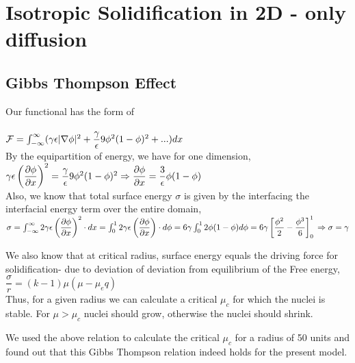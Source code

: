 \documentclass[a4paper]{report}
\begin{document}
\section{Isotropic Solidification in 2D - only diffusion}

\subsection*{Gibbs Thompson Effect}

Our functional has the form of\\
\\
${\cal F} = \int_{-\infty}^{\infty}(\gamma \epsilon|\nabla\phi|^2 + \dfrac{\gamma}{\epsilon}9\phi^2(1-\phi)^2 + ...)dx$\\
By the equipartition of energy, we have for one dimension,\\

$\gamma\epsilon\left(\dfrac{\partial\phi}{\partial x}\right)^2 = \dfrac{\gamma}{\epsilon}9\phi^2(1-\phi)^2\\
\Rightarrow \dfrac{\partial\phi}{\partial x} = \dfrac{3}{\epsilon}\phi(1-\phi)$\\

Also, we know that total surface energy $\sigma$ is given by the interfacing the interfacial 
energy term over the entire domain,\\
$\sigma = \int_{-\infty}^{\infty}2\gamma\epsilon\left(\dfrac{\partial\phi}{\partial x}\right)^2\cdot dx\\
= \int_{0}^{1}2\gamma\epsilon\left(\dfrac{\partial\phi}{\partial x}\right)\cdot d\phi\\
= 6\gamma\int_{0}^{1}2\phi(1-\phi) d\phi\\
= 6\gamma \left[\dfrac{\phi^2}{2} - \dfrac{\phi^3}{6}\right]_{0}^{1}\\
\Rightarrow \sigma = \gamma\\
$

We also know that at critical radius, surface energy equals the driving force for solidification- 
due to deviation of deviation from equilibrium of the Free energy,
 \\ 
$\dfrac{\sigma}{r} = (k-1)\mu\left(\mu-\mu_eq\right)$ \\
Thus, for a given radius we can calculate a critical $\mu_c$ for which the nuclei is 
stable. For $\mu > \mu_c$ nuclei should grow, otherwise the nuclei should shrink.
 
We used the above relation to calculate the critical $\mu_c$ for a 
radius of 50 units and found out that this Gibbs Thompson relation indeed holds for 
the present model.
\end{document}

